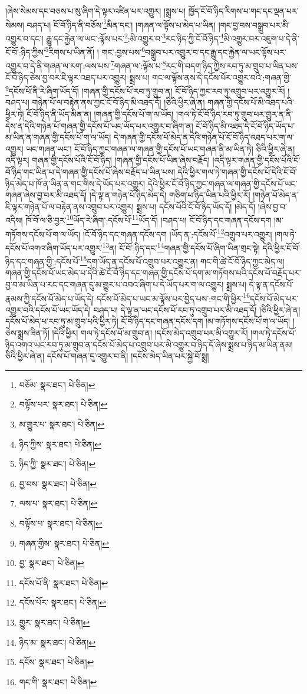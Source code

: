 །ཞེས་སེམས་དང་བཅས་པ་སུ་ཞིག་དེ་ལྟར་འཛིན་པར་འགྱུར། །སྨྲས་པ། ཁྱོད་ངོ་བོ་ཉིད་རིགས་པ་གང་དང་ལྡན་པར་སེམས། བཤད་པ། ངོ་བོ་ཉིད་ནི་བཅོས་\footnote{བཅོམ་  སྣར་ཐང་།  པེ་ཅིན། }མིན་དང་། །གཞན་ལ་ལྟོས་པ་མེད་པ་ཡིན། །གང་བྱ་བས་བསྒྲུབ་པར་མི་འགྱུར་བ་དང་། རྒྱུ་དང་རྐྱེན་ལ་ཡང་:ལྟོས་པར་\footnote{བལྟོས་པར་  སྣར་ཐང་།  པེ་ཅིན། }:མི་འགྱུར་བ་\footnote{མ་གྱུར་པ་  སྣར་ཐང་།  པེ་ཅིན། }རང་ཉིད་ཀྱི་ངོ་བོ་ཉིད་\footnote{ཉིད་ཀྱིས་  སྣར་ཐང་།  པེ་ཅིན། }མི་འགྱུར་བར་འཇུག་པ་དེ་ནི་ངོ་བོ་:ཉིད་ཀྱིས་\footnote{ཉིད་ཀྱི་  སྣར་ཐང་།  པེ་ཅིན། }རིགས་པ་ཡིན་ནོ། །
གང་:བྱས་པས་\footnote{བྱ་བས་  སྣར་ཐང་།  པེ་ཅིན། }བསྒྲུབ་པར་འགྱུར་བ་དང་རྒྱུ་དང་རྐྱེན་ལ་ཡང་ལྟོས་པར་འགྱུར་བ་དེ་ནི་གཞན་ལ་རག་:ལས་པས་\footnote{ལས་པ་  སྣར་ཐང་།  པེ་ཅིན། }གཞན་ལ་:ལྟོས་པ་\footnote{བལྟོས་པ་  སྣར་ཐང་།  པེ་ཅིན། }རང་གི་བདག་ཉིད་ཀྱིས་རབ་ཏུ་མ་གྲུབ་པ་ཡིན་པས་ངོ་བོ་ཉིད་ཅེས་བྱ་བར་ཇི་ལྟར་འཐད་པར་འགྱུར། སྨྲས་པ། གང་ལ་ལྟོས་ནས་དེ་དངོས་པོར་འགྱུར་བའི་:གཞན་གྱི་\footnote{གཞན་གྱིས་  སྣར་ཐང་།  པེ་ཅིན། }དངོས་པོ་ནི་རེ་ཞིག་ཡོད་དོ། །གཞན་གྱི་དངོས་པོ་རབ་ཏུ་གྲུབ་ན། ངོ་བོ་ཉིད་ཀྱང་རབ་ཏུ་འགྲུབ་པར་འགྱུར་རོ། །བཤད་པ། གཉེན་པོ་ལ་བརྟེན་ནས་ཀྱང་ངོ་བོ་ཉིད་མི་འཐད་དོ། །ཅིའི་ཕྱིར་ཞེ་ན། གཞན་གྱི་དངོས་པོ་མི་འཐད་པའི་ཕྱིར་ཏེ། ངོ་བོ་ཉིད་ནི་ཡོད་མིན་ན། །གཞན་གྱི་དངོས་པོ་ག་ལ་ཡོད། །གལ་ཏེ་ངོ་བོ་ཉིད་རབ་ཏུ་གྲུབ་པར་གྱུར་ན་ནི་དེས་ན་དེའི་གཉེན་པོ་གཞན་གྱི་དངོས་པོ་ཡང་ཡོད་པར་འགྱུར་བ་ཞིག་ན། ངོ་བོ་ཉིད་མི་འཐད་དེ་ངོ་བོ་ཉིད་ཡོད་པ་མ་ཡིན་ན་གཞན་གྱི་དངོས་པོ་ག་ལ་ཡོད། དེ་གཞན་གྱི་དངོས་པོ་མེད་ན་དེའི་གཉེན་པོ་ངོ་བོ་ཉིད་འཐད་པར་ག་ལ་འགྱུར། ཡང་གཞན་ཡང་། ངོ་བོ་ཉིད་ཀྱང་གཞན་ལ་གཞན་གྱི་དངོས་པོ་ཡང་གཞན་ནི་མ་ཡིན་ཏེ། ཅིའི་ཕྱིར་ཞེ་ན། འདི་ལྟར། གཞན་གྱི་དངོས་པོའི་ངོ་བོ་ཉིད། །གཞན་གྱི་དངོས་པོ་ཡིན་ཞེས་བརྗོད། །འདི་ལྟར་གཞན་གྱི་དངོས་པོའི་ངོ་བོ་ཉིད་གང་ཡིན་པ་དེ་གཞན་གྱི་དངོས་པོ་ཞེས་བརྗོད་པ་ཡིན་པས། དེའི་ཕྱིར་གལ་ཏེ་གཞན་གྱི་དངོས་པོ་དེའི་ངོ་བོ་ཉིད་མེད་པ་ཁོ་ན་ཡིན་ན་གང་གིས་དེ་ཡོད་པར་འགྱུར། དེའི་ཕྱིར་ངོ་བོ་ཉིད་ཀྱང་གཞན་ལ་གཞན་གྱི་དངོས་པོ་ཡང་གཞན་ཞེས་བྱ་བར་མི་འཐད་དོ། །དེ་ལྟ་ན་གཉེན་པོ་ཉིད་མེད་དེ། གཅིག་པ་ཉིད་ཡིན་པའི་ཕྱིར་རོ། །གཉེན་པོ་མེད་ན་ཇི་ལྟར་གཉེན་པོ་ལ་བརྟེན་ནས་འགྲུབ་པར་འགྱུར། སྨྲས་པ། དངོས་པོའི་ངོ་བོ་ཉིད་ཡོད་དོ། །མེད་དོ། །ཞེས་བྱ་བ་འདིས། ཁོ་བོ་ལ་ཅི་བྱར་\footnote{བྱ་  སྣར་ཐང་།  པེ་ཅིན། }ཡོད་རེ་ཞིག་:དངོས་པོ་\footnote{དངོས་པོ་ནི་  སྣར་ཐང་།  པེ་ཅིན། }ཡོད་དོ། །བཤད་པ། ངོ་བོ་ཉིད་དང་གཞན་དངོས་དག །མ་གཏོགས་དངོས་པོ་ག་ལ་ཡོད། །ངོ་བོ་ཉིད་དང་གཞན་དངོས་དག །ཡོད་ན་:དངོས་པོ་\footnote{དངོས་པོར་  སྣར་ཐང་།  པེ་ཅིན། }འགྲུབ་པར་འགྱུར། །གལ་ཏེ་དངོས་པོ་འགའ་ཞིག་ཡོད་པར་འགྱུར་\footnote{གྱུར་  སྣར་ཐང་།  པེ་ཅིན། }ན། ངོ་བོ་:ཉིད་དང་\footnote{ཉིད་མ་  སྣར་ཐང་།  པེ་ཅིན། }གཞན་གྱི་དངོས་པོ་ཞིག་ཡིན་གྲང་སྟེ། དེའི་ཕྱིར་ངོ་བོ་ཉིད་དང་གཞན་གྱི་:དངོས་པོ་\footnote{དངོས་  སྣར་ཐང་།  པེ་ཅིན། }དག་ཡོད་ན་དངོས་པོ་འགྲུབ་པར་འགྱུར་ན། གང་གི་ཚེ་ངོ་བོ་ཉིད་ཀྱང་མེད་ལ། གཞན་གྱི་དངོས་པོ་ཡང་མེད་པ་དེའི་ཚེ་ངོ་བོ་ཉིད་དང་གཞན་གྱི་དངོས་པོ་དག་མ་གཏོགས་པའི་དངོས་པོ་བརྗོད་པར་བྱ་བ་མ་ཡིན་པ་རང་དང་གཞན་དུ་མ་གྱུར་པ་འབའ་ཞིག་པ་དེ་ཡོད་པར་ག་ལ་འགྱུར། སྨྲས་པ། དེ་ལྟ་ན་དངོས་པོ་རྣམས་ཀྱི་དངོས་པོ་མེད་པ་ཡོད་དེ། དངོས་པོ་མེད་པ་ཡང་མ་ལྟོས་པར་བྱེད་པས་:གང་གི་ཕྱིར་\footnote{གང་གི་  སྣར་ཐང་།  པེ་ཅིན། }དངོས་པོ་མེད་པར་འགྱུར་བའི་དངོས་པོ་ཡང་ཡོད་དེ། བཤད་པ། དེ་ལྟ་ན་ཡང་དངོས་པོ་རབ་ཏུ་འགྲུབ་པར་མི་འཐད་དོ། །ཅིའི་ཕྱིར་ཞེ་ན། དངོས་པོ་མེད་པ་རབ་ཏུ་མ་གྲུབ་པའི་ཕྱིར་ཏེ། ངོ་བོ་ཉིད་དང་གཞན་དངོས་དག །མ་གཏོགས་དངོས་པོ་ག་ལ་ཡོད། །ཅེས་སྨྲས་ཟིན་ཏོ། །དེའི་ཕྱིར། གལ་ཏེ་དངོས་པོ་མ་གྲུབ་ན། །དངོས་མེད་འགྲུབ་པར་མི་འགྱུར་རོ། །གལ་ཏེ་དངོས་པོ་ཉིད་འགའ་ཡང་རབ་ཏུ་མ་གྲུབ་ན་དངོས་པོ་མེད་པ་འགྲུབ་པར་མི་འགྱུར་བ་ཉིད་དོ་ཞེས་སྨྲས་པ་ཉིད་མ་ཡིན་ནམ། ཅིའི་ཕྱིར་ཞེ་ན། དངོས་པོ་གཞན་དུ་འགྱུར་བ་ནི། །དངོས་མེད་ཡིན་པར་སྐྱེ་བོ་སྨྲ། 